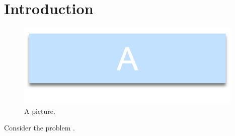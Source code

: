 \section{Introduction}



\begin{figure}[h!]
    \centering
    \includegraphics[height=4cm]{media/a_picture.png}
    \caption{A picture.}
    \label{fig:picture}
\end{figure}

Consider the problem \cite{paper}.